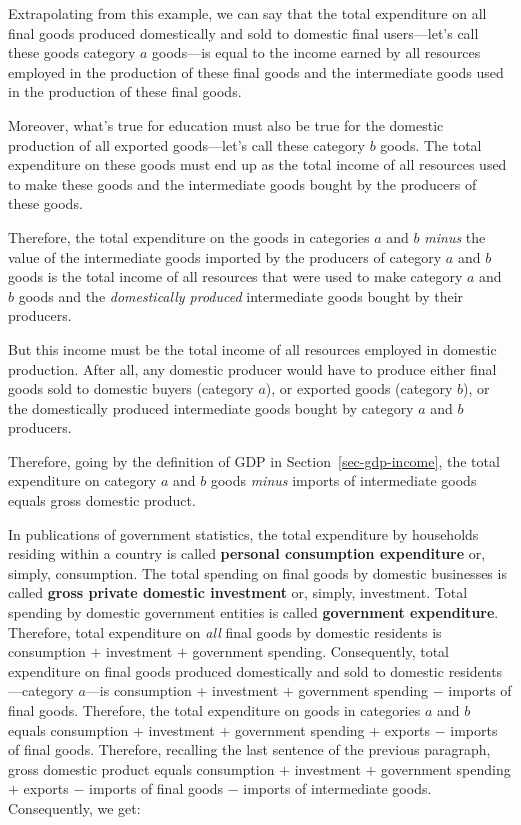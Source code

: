 \documentclass[
  letterpaper,
]{book}
\begin{document}
Extrapolating from this example, we can say that the total expenditure
on all final goods produced domestically and sold to domestic final
users---let's call these goods category \(a\) goods---is equal to the
income earned by all resources employed in the production of these final
goods and the intermediate goods used in the production of these final
goods.

Moreover, what's true for education must also be true for the domestic
production of all exported goods---let's call these category \(b\)
goods. The total expenditure on these goods must end up as the total
income of all resources used to make these goods and the intermediate
goods bought by the producers of these goods.

Therefore, the total expenditure on the goods in categories \(a\) and
\(b\) \emph{minus} the value of the intermediate goods imported by the
producers of category \(a\) and \(b\) goods is the total income of all
resources that were used to make category \(a\) and \(b\) goods and the
\emph{domestically produced} intermediate goods bought by their
producers.

But this income must be the total income of all resources employed in
domestic production. After all, any domestic producer would have to
produce either final goods sold to domestic buyers (category \(a\)), or
exported goods (category \(b\)), or the domestically produced
intermediate goods bought by category \(a\) and \(b\) producers.

Therefore, going by the definition of GDP in
Section~\ref{sec-gdp-income}, the total expenditure on category \(a\)
and \(b\) goods \emph{minus} imports of intermediate goods equals gross
domestic product.

In publications of government statistics, the total expenditure by
households residing within a country is called \textbf{personal
consumption expenditure} or, simply, consumption. The total spending on
final goods by domestic businesses is called \textbf{gross private
domestic investment} or, simply, investment. Total spending by domestic
government entities is called \textbf{government expenditure}.
Therefore, total expenditure on \emph{all} final goods by domestic
residents is consumption \(+\) investment \(+\) government spending.
Consequently, total expenditure on final goods produced domestically and
sold to domestic residents---category \(a\)---is consumption \(+\)
investment \(+\) government spending \(-\) imports of final goods.
Therefore, the total expenditure on goods in categories \(a\) and \(b\)
equals consumption \(+\) investment \(+\) government spending \(+\)
exports \(-\) imports of final goods. Therefore, recalling the last
sentence of the previous paragraph, gross domestic product equals
consumption \(+\) investment \(+\) government spending \(+\) exports
\(-\) imports of final goods \(-\) imports of intermediate goods.
Consequently, we get:
\end{document}
